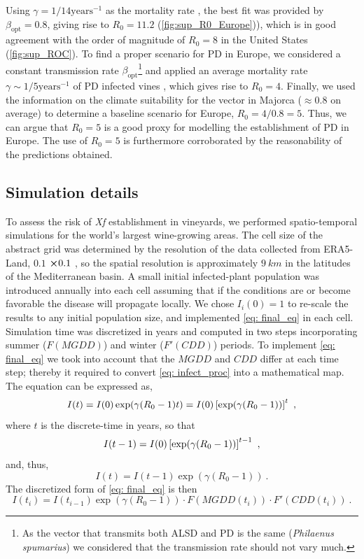 Using $\gamma=1/14 \textrm{years}^{-1}$ as the mortality rate
\cite{Moralejo2020}, the best fit was provided by $\beta_{\textrm{opt}}=0.8$,
giving rise to $R_0=11.2$ (\cref{fig:sup_R0_Europe})), which is in good
agreement with the order of magnitude of $R_0=8$ in the United States
(\cref{fig:sup_ROC}). To find a proper scenario for PD in Europe, we considered
a constant transmission rate $\beta_{\textrm{opt}}$\footnote{As the vector that
    transmits both ALSD and PD is the same (\textit{Philaenus spumarius}) we
    considered that the transmission rate should not vary much.} and applied an
average mortality rate $\gamma\sim 1/5 \textrm{years}^{-1}$ of PD infected
vines \cite{Purcell2013}, which gives
rise to $R_0=4$. Finally, we used the information on the climate suitability
for the vector in Majorca ($\approx0.8$ on average) to determine a baseline
scenario for Europe, $R_0=4/0.8=5$. Thus, we can argue that $R_0=5$ is a good
proxy for modelling the establishment of PD in Europe. The use of $R_0=5$ is
furthermore corroborated by the reasonability of the predictions obtained.

\subsection{Simulation details}\label{app:risk_index}

To assess the risk of \textit{Xf} establishment in vineyards, we performed
spatio-temporal simulations for the world's largest wine-growing areas. The
cell
size of the abstract grid was determined by the resolution of the data
collected from ERA5-Land, $0.1$ \textdegree $\cross 0.1$ \textdegree , so the
spatial resolution is approximately $\SI{9}{km}$ in the latitudes of the
Mediterranean basin. A small initial infected-plant population was introduced
annually into each cell assuming that if the conditions are or become
favorable the disease will propagate locally. We chose $I_i(0)=1$ to re-scale
the results to any initial population size, and implemented \cref{eq: final_eq}
in each cell. Simulation time was discretized in years and computed in two
steps incorporating summer ($F(MGDD)$) and winter ($F'(CDD)$) periods. To
implement \cref{eq: final_eq} we took into account that the $MGDD$ and $CDD$
differ at each time step; thereby it required to convert \cref{eq: infect_proc}
into a mathematical map. The equation can be expressed as,
\begin{equation}
    I(t)=I(0)\exp(\gamma(R_0-1)t)=I(0)\left[\exp(\gamma(R_0-1))\right]^t \ ,
\end{equation}
where $t$ is the discrete-time in years,
so that
\begin{equation}
    I(t-1)=I(0)\left[\exp(\gamma(R_0-1))\right]^{t-1} \ ,
\end{equation}
and, thus,
\begin{equation}
    I(t)=I(t-1)\exp(\gamma(R_0-1)) \ .
\end{equation}
The discretized form of \cref{eq: final_eq} is then
\begin{equation}
    I(t_i)=I(t_{i-1})\exp(\gamma(R_0-1))\cdot F(MGDD(t_i))\cdot
    F'(CDD(t_i)) \ .
    \label{eq:imapevol}
\end{equation}

